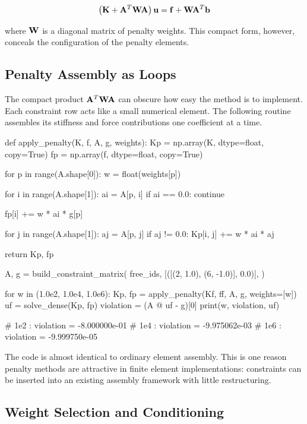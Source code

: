 \begin{equation}
    \left( \mathbf{K} + \mathbf{A}^T \mathbf{W} \mathbf{A} \right) \mathbf{u}
    = \mathbf{f} + \mathbf{W} \mathbf{A}^T \mathbf{b}
\end{equation}

where $ \mathbf{W} $ is a diagonal matrix of penalty weights. This compact form,
however, conceals the configuration of the penalty elements.



\subsection{Penalty Assembly as Loops}

The compact product $\mathbf{A}^T\mathbf{W}\mathbf{A}$ can obscure how easy the method is to
implement. Each constraint row acts like a small numerical element. The following
routine assembles its stiffness and force contributions one coefficient at a
time.

\begin{python}
def apply_penalty(K, f, A, g, weights):
    Kp = np.array(K, dtype=float, copy=True)
    fp = np.array(f, dtype=float, copy=True)

    for p in range(A.shape[0]):
        w = float(weights[p])

        for i in range(A.shape[1]):
            ai = A[p, i]
            if ai == 0.0:
                continue

            fp[i] += w * ai * g[p]

            for j in range(A.shape[1]):
                aj = A[p, j]
                if aj != 0.0:
                    Kp[i, j] += w * ai * aj

    return Kp, fp


A, g = build_constraint_matrix(
    free_ids,
    [([(2, 1.0), (6, -1.0)], 0.0)],
)

for w in (1.0e2, 1.0e4, 1.0e6):
    Kp, fp = apply_penalty(Kf, ff, A, g, weights=[w])
    uf = solve_dense(Kp, fp)
    violation = (A @ uf - g)[0]
    print(w, violation, uf)

# 1e2 : violation = -8.000000e-01
# 1e4 : violation = -9.975062e-03
# 1e6 : violation = -9.999750e-05
\end{python}

The code is almost identical to ordinary element assembly. This is one reason
penalty methods are attractive in finite element implementations: constraints
can be inserted into an existing assembly framework with little restructuring.

\subsection{Weight Selection and Conditioning}

